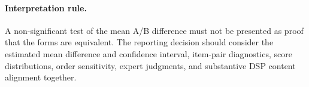 \documentclass[10pt,a4paper]{article}
\begin{document}
\paragraph{Interpretation rule.}
A non-significant test of the mean A/B difference must not be presented as proof that the forms are equivalent. The reporting decision should consider the estimated mean difference and confidence interval, item-pair diagnostics, score distributions, order sensitivity, expert judgments, and substantive DSP content alignment together.
\end{document}

